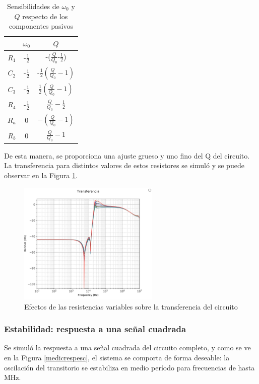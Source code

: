 \begin{table}[H]
\begin{centering}
\begin{tabular}{|c|c|c|}
\hline 
 & $\omega_{0}$ & $Q$\tabularnewline
\hline 
$R_{1}$ & -$\frac{1}{2}$ & -($\frac{Q}{Q_{0}}$-$\frac{1}{2}$)\tabularnewline
\hline 
$C_{2}$ & -$\frac{1}{2}$ & -$\frac{1}{2}(\frac{Q}{Q_{0}}-1)$\tabularnewline
\hline 
$C_{3}$ & -$\frac{1}{2}$ & $\frac{1}{2}(\frac{Q}{Q_{0}}-1)$\tabularnewline
\hline 
$R_{4}$ & -$\frac{1}{2}$ & $\frac{Q}{Q_{0}}-\frac{1}{2}$\tabularnewline
\hline 
$R_{a}$ & 0 & $-(\frac{Q}{Q_{0}}-1)$\tabularnewline
\hline 
$R_{b}$ & 0 & $\frac{Q}{Q_{0}}-1$\tabularnewline
\hline 
\end{tabular}
\par\end{centering}
\label{sensibilidades}
\caption{Sensibilidades de $\omega_{0}$ y $Q$ respecto de los componentes
pasivos}
\end{table}

De esta manera, se proporciona una ajuste grueso y uno fino del Q del circuito. La transferencia para distintos valores de estos resistores se simuló y se puede observar en la Figura \ref{ambospreset}.
\begin{figure}[H]
    \centering
    \includegraphics[width=0.6\textwidth]{../Ex3/Resources/ambospreset.png}
    \caption{Efectos de las resistencias variables sobre la transferencia del circuito}
    \label{ambospreset}
\end{figure}

\subsubsection{Estabilidad: respuesta a una señal cuadrada}
Se simuló la respuesta a una señal cuadrada del circuito completo, y como se ve en la Figura \ref{medicrespesc}, el sistema se comporta de forma deseable: la oscilación del transitorio se estabiliza en medio período para frecuencias de hasta MHz.


